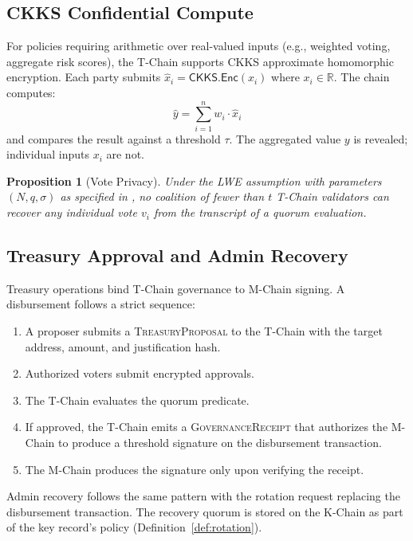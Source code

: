 \documentclass[11pt,a4paper]{article}
\newtheorem{proposition}[theorem]{Proposition}
\begin{document}
\subsection{CKKS Confidential Compute}

For policies requiring arithmetic over real-valued inputs (e.g., weighted voting,
aggregate risk scores), the T-Chain supports CKKS approximate homomorphic encryption.
Each party submits $\hat{x}_i = \mathsf{CKKS.Enc}(x_i)$ where $x_i \in \mathbb{R}$.
The chain computes:
\[
    \hat{y} = \sum_{i=1}^{n} w_i \cdot \hat{x}_i
\]
and compares the result against a threshold $\tau$. The aggregated value $y$ is
revealed; individual inputs $x_i$ are not.

\begin{proposition}[Vote Privacy]\label{prop:vote-privacy}
Under the LWE assumption with parameters $(N, q, \sigma)$ as specified in
\cite{lux-pq-crypto-suite}, no coalition of fewer than $t$ T-Chain validators
can recover any individual vote $v_i$ from the transcript of a quorum evaluation.
\end{proposition}

\subsection{Treasury Approval and Admin Recovery}

Treasury operations bind T-Chain governance to M-Chain signing. A disbursement
follows a strict sequence:

\begin{enumerate}
    \item A proposer submits a \textsc{TreasuryProposal} to the T-Chain with
          the target address, amount, and justification hash.
    \item Authorized voters submit encrypted approvals.
    \item The T-Chain evaluates the quorum predicate.
    \item If approved, the T-Chain emits a \textsc{GovernanceReceipt} that
          authorizes the M-Chain to produce a threshold signature on the
          disbursement transaction.
    \item The M-Chain produces the signature only upon verifying the receipt.
\end{enumerate}

Admin recovery follows the same pattern with the rotation request replacing the
disbursement transaction. The recovery quorum is stored on the K-Chain as part
of the key record's policy (Definition~\ref{def:rotation}).
\end{document}
